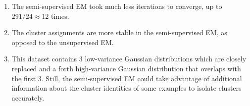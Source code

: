 \begin{answer}
\begin{enumerate}
\item The semi-supervised EM took much less iterations to converge, up to $291/24 \approx 12$ times.
\item The cluster assignments are more stable in the semi-supervised EM, as opposed to the unsupervised EM.
\item This dataset contains 3 low-variance Gaussian distributions which are closely replaced and a forth high-variance Gaussian distribution that overlaps with the first 3. Still, the semi-supervised EM could take advantage of additional information about the cluster identities of some examples to isolate clusters accurately.
\end{enumerate}
\end{answer}
